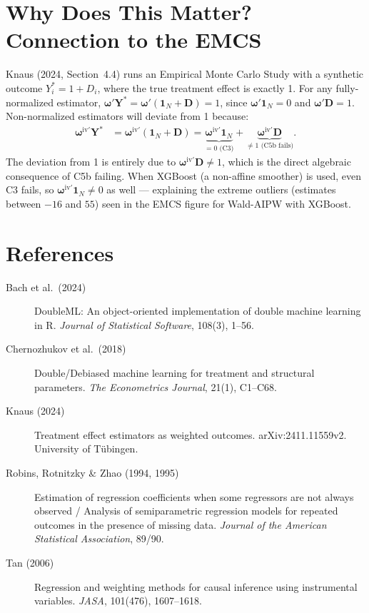 \documentclass[12pt, a4paper]{article}
\theoremstyle{condstyle}
\theoremstyle{plain}
\newcommand{\bone}{\mathbf{1}_N}
\newcommand{\bD}{\mathbf{D}}
\begin{document}
\section{Why Does This Matter? Connection to the EMCS}
\label{sec:emcs}

Knaus (2024, Section~4.4) runs an Empirical Monte Carlo Study with a synthetic
outcome $Y^*_i = 1 + D_i$, where the true treatment effect is exactly 1.
For any fully-normalized estimator, $\boldsymbol{\omega}'\mathbf{Y}^* = \boldsymbol{\omega}'(\bone + \bD) = 1$,
since $\boldsymbol{\omega}'\bone = 0$ and $\boldsymbol{\omega}'\bD = 1$.
Non-normalized estimators will deviate from 1 because:
\begin{align*}
  \boldsymbol{\omega}^{\mathrm{iv}\prime}\mathbf{Y}^*
  &= \boldsymbol{\omega}^{\mathrm{iv}\prime}(\bone + \bD)
   = \underbrace{\boldsymbol{\omega}^{\mathrm{iv}\prime}\bone}_{=0\text{ (C3)}}
   + \underbrace{\boldsymbol{\omega}^{\mathrm{iv}\prime}\bD}_{\neq 1\text{ (C5b fails)}}.
\end{align*}
The deviation from 1 is entirely due to $\boldsymbol{\omega}^{\mathrm{iv}\prime}\bD \neq 1$,
which is the direct algebraic consequence of C5b failing.
When XGBoost (a non-affine smoother) is used, even C3 fails, so
$\boldsymbol{\omega}^{\mathrm{iv}\prime}\bone \neq 0$ as well --- explaining the
extreme outliers (estimates between $-16$ and $55$) seen in the EMCS figure
for Wald-AIPW with XGBoost.

\section*{References}

\begin{description}
  \item[Bach et al.\ (2024)] DoubleML: An object-oriented implementation of double
  machine learning in R. \textit{Journal of Statistical Software}, 108(3), 1--56.
  \item[Chernozhukov et al.\ (2018)] Double/Debiased machine learning for treatment
  and structural parameters. \textit{The Econometrics Journal}, 21(1), C1--C68.
  \item[Knaus (2024)] Treatment effect estimators as weighted outcomes.
  arXiv:2411.11559v2. University of Tübingen.
  \item[Robins, Rotnitzky \& Zhao (1994, 1995)] Estimation of regression coefficients
  when some regressors are not always observed / Analysis of semiparametric regression
  models for repeated outcomes in the presence of missing data.
  \textit{Journal of the American Statistical Association}, 89/90.
  \item[Tan (2006)] Regression and weighting methods for causal inference using
  instrumental variables. \textit{JASA}, 101(476), 1607--1618.
\end{description}
\end{document}
